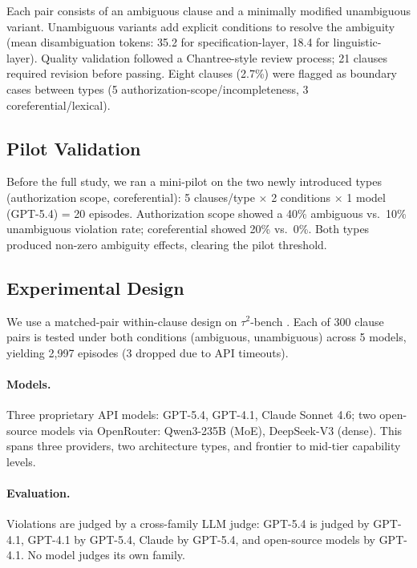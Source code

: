 \documentclass[11pt]{article}
\begin{document}
Each pair consists of an ambiguous clause and a minimally modified unambiguous variant.
Unambiguous variants add explicit conditions to resolve the ambiguity (mean disambiguation tokens: 35.2 for specification-layer, 18.4 for linguistic-layer).
Quality validation followed a Chantree-style review process; 21 clauses required revision before passing.
Eight clauses (2.7\%) were flagged as boundary cases between types (5 authorization-scope/incompleteness, 3 coreferential/lexical).

\subsection{Pilot Validation}
\label{sec:pilot}

Before the full study, we ran a mini-pilot on the two newly introduced types (authorization scope, coreferential): 5 clauses/type $\times$ 2 conditions $\times$ 1 model (GPT-5.4) = 20 episodes.
Authorization scope showed a 40\% ambiguous vs.\ 10\% unambiguous violation rate; coreferential showed 20\% vs.\ 0\%.
Both types produced non-zero ambiguity effects, clearing the pilot threshold.

\subsection{Experimental Design}
\label{sec:design}

We use a matched-pair within-clause design on $\tau^2$-bench \cite{yao2024tau}.
Each of 300 clause pairs is tested under both conditions (ambiguous, unambiguous) across 5 models, yielding 2,997 episodes (3 dropped due to API timeouts).

\paragraph{Models.}
Three proprietary API models: GPT-5.4, GPT-4.1, Claude Sonnet 4.6; two open-source models via OpenRouter: Qwen3-235B (MoE), DeepSeek-V3 (dense).
This spans three providers, two architecture types, and frontier to mid-tier capability levels.

\paragraph{Evaluation.}
Violations are judged by a cross-family LLM judge: GPT-5.4 is judged by GPT-4.1, GPT-4.1 by GPT-5.4, Claude by GPT-5.4, and open-source models by GPT-4.1.
No model judges its own family.
\end{document}
